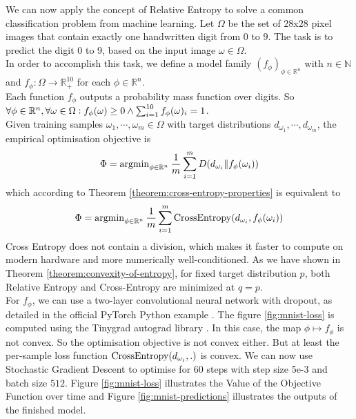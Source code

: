 \begin{example}
    We can now apply the concept of Relative Entropy to solve a common classification problem from machine learning.
    Let $\Omega$ be the set of $28$x$28$ pixel images that contain exactly one handwritten digit from $0$ to $9$.
    The task is to predict the digit $0$ to $9$, based on the input image $\omega \in \Omega$. \\
    In order to accomplish this task, we define a model family $(f_{\phi})_{\phi \in \mathbb{R}^n}$ with $n \in \mathbb{N}$ and
    $f_{\phi}: \Omega \rightarrow \mathbb{R}_{+}^{10}$ for each $\phi \in \mathbb{R}^n$. \\
    Each function $f_{\phi}$ outputs a probability mass function over digits.
    So $\forall \phi \in \mathbb{R}^n, \forall \omega \in \Omega\vcentcolon f_{\phi}(\omega) \ge 0 \land \sum_{i=1}^{10} f_{\phi}(\omega)_i = 1$. \\
    Given training samples $\omega_1, \cdots, \omega_m \in \Omega$ with target distributions
    $d_{\omega_1}, \cdots, d_{\omega_m}$, the empirical optimisation objective is
    \[
        \Phi = \operatorname{argmin}_{\phi \in \mathbb{R}^n}{\frac{1}{m}\sum_{i=1}^{m}{D(d_{\omega_i} \| f_{\phi}(\omega_i))}}
    \]
    which according to Theorem \ref{theorem:cross-entropy-properties} is equivalent to
    \[
        \Phi = \operatorname{argmin}_{\phi \in \mathbb{R}^n}{\frac{1}{m}\sum_{i=1}^{m}{\operatorname{CrossEntropy}(d_{\omega_i}, f_{\phi}(\omega_i))}}
    \]
    Cross Entropy does not contain a division, which makes it faster to compute on modern hardware and more numerically well-conditioned.
    As we have shown in Theorem \ref{theorem:convexity-of-entropy}, for fixed target distribution $p$, both Relative Entropy and Cross-Entropy are minimized at $q = p$. \\
    For $f_{\phi}$, we can use a two-layer convolutional neural network with dropout, as detailed in the official PyTorch Python example \cite{Pytorch:MNIST}.
	The figure \ref{fig:mnist-loss} is computed using the Tinygrad autograd library \cite{Tinygrad}.
    In this case, the map $\phi \mapsto f_{\phi}$ is not convex. So the optimisation objective is not convex either.
    But at least the per-sample loss function $\operatorname{CrossEntropy}(d_{\omega_i}, .)$ is convex.
    We can now use Stochastic Gradient Descent to optimise for $60$ steps with step size 5e-3 and batch size $512$.
    Figure \ref{fig:mnist-loss} illustrates the Value of the Objective Function over time 
    and Figure \ref{fig:mnist-predictions} illustrates the outputs of the finished model.
\end{example}
